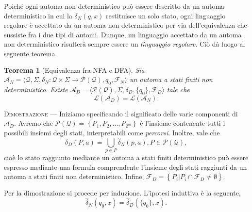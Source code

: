 \documentclass[10pt]{\classname}
\theoremstyle{newlinethm}
\newtheorem{thm}{Teorema}[section]
\theoremstyle{theorem}
\theoremstyle{definition}
\theoremstyle{definition}
\theoremstyle{definition}
\theoremstyle{definition}
\begin{document}
\clearpage

Poiché ogni automa non deterministico può essere descritto da un automa
deterministico in cui la $\delta_N(q, x)$ restituisce un solo stato, ogni
linguaggio regolare è accettato da un automa non deterministico per via
dell'equivalenza che sussiste fra i due tipi di automi. Dunque, un linguaggio
accettato da un automa non deterministico risulterà sempre essere
un \emph{linguaggio regolare}. Ciò dà luogo al seguente teorema.

\begin{thm}[Equivalenza fra NFA e DFA]
    Sia $\mathcal A_N = \langle \mathcal Q, \Sigma, \delta_N : \mathcal Q \times \Sigma \rightarrow \mathcal P ( \mathcal Q ), q_0, \mathcal F_N \rangle$ un automa a stati finiti non deterministico. Esiste $\mathcal A_D = \langle \mathcal P ( \mathcal Q ), \Sigma, \delta_D, \{q_0\}, \mathcal F_D \rangle$ tale che \[\mathcal L (\mathcal A_D) = \mathcal L (\mathcal A_N).\]
\end{thm}

\textsc{Dimostrazione} --- Iniziamo specificando il significato delle varie componenti di $\mathcal A_D$. Avremo che $\mathcal P (\mathcal Q) = \left\{P_1, P_2, \dots, P_{2^m}\right\}$ è l'insieme contenente tutti i possibili insiemi degli stati, interpretabili come \emph{percorsi}. Inoltre, vale che \[\delta_D (P, a) = \bigcup_{p \in P} \hat\delta_N(p, a), P \in \mathcal P ( \mathcal Q),\] cioè lo stato raggiunto mediante un automa a stati finiti deterministico può essere espresso mediante una formula comprendente l'insieme degli stati raggiunti da un automa a stati finiti non deterministico. Infine, $\mathcal F_D = \left\{P_i | P_i \cap \mathcal F_D \neq \emptyset\right\}$.

Per la dimostrazione si procede per induzione. L'ipotesi induttiva è la seguente, \[\hat \delta_N (q_0, x) = \hat \delta_D(\{q_0\}, x).\]
\end{document}
